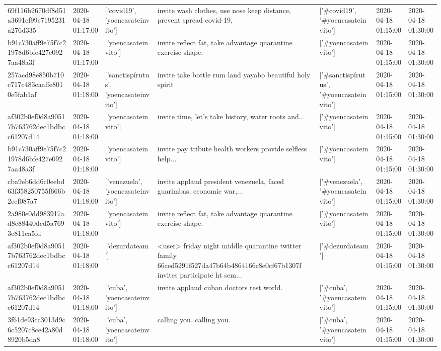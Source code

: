 \begin{tabular}{lllllll}
69f116b2670df8d51a3691ef99c7195231a276d335 & 2020-04-18 01:17:00 & ['covid19', 'yoencasateinvito'] & invite wash clothes, use nose keep distance, prevent spread covid-19, & ['#covid19', '#yoencasateinvito'] & 2020-04-18 01:15:00 & 2020-04-18 01:30:00 \\
b91c730aff9e75f7c21978d6bfe427e0927aa48a3f & 2020-04-18 01:17:00 & ['yoencasateinvito'] & invite reflect fat, take advantage quarantine exercise shape. & ['#yoencasateinvito'] & 2020-04-18 01:15:00 & 2020-04-18 01:30:00 \\
257acd98e850b710c717c483caaffe8010e5fab1af & 2020-04-18 01:18:00 & ['sanctispírutus', 'yoencasateinvito'] & invite take bottle rum land yayabo beautiful holy spirit & ['#sanctispírutus', '#yoencasateinvito'] & 2020-04-18 01:15:00 & 2020-04-18 01:30:00 \\
af302b0ef0d8a90517b763762dec1bdbcc61207d14 & 2020-04-18 01:18:00 & ['yoencasateinvito'] & invite time, let's take history, water roots and... & ['#yoencasateinvito'] & 2020-04-18 01:15:00 & 2020-04-18 01:30:00 \\
b91c730aff9e75f7c21978d6bfe427e0927aa48a3f & 2020-04-18 01:18:00 & ['yoencasateinvito'] & invite pay tribute health workers provide selfless help... & ['#yoencasateinvito'] & 2020-04-18 01:15:00 & 2020-04-18 01:30:00 \\
cba9eb6dd6c0eebd63f358250755f666b2ecf087a7 & 2020-04-18 01:18:00 & ['venezuela', 'yoencasateinvito'] & invite applaud president venezuela, faced guarimbas, economic war,... & ['#venezuela', '#yoencasateinvito'] & 2020-04-18 01:15:00 & 2020-04-18 01:30:00 \\
2a980e0dd983917ad8c88440dcd5a7693c811ca5fd & 2020-04-18 01:18:00 & ['yoencasateinvito'] & invite reflect fat, take advantage quarantine exercise shape. & ['#yoencasateinvito'] & 2020-04-18 01:15:00 & 2020-04-18 01:30:00 \\
af302b0ef0d8a90517b763762dec1bdbcc61207d14 & 2020-04-18 01:18:00 & ['dezurdateam'] & <user> friday night middle quarantine twitter family 66ced5291f527da47b64b4864166c8e0cf67b1307f invites participate ht sem... & ['#dezurdateam'] & 2020-04-18 01:15:00 & 2020-04-18 01:30:00 \\
af302b0ef0d8a90517b763762dec1bdbcc61207d14 & 2020-04-18 01:18:00 & ['cuba', 'yoencasateinvito'] & invite applaud cuban doctors rest world. & ['#cuba', '#yoencasateinvito'] & 2020-04-18 01:15:00 & 2020-04-18 01:30:00 \\
3f61de93cc3013d9c6c5207c8ce42a80d8920b5da8 & 2020-04-18 01:18:00 & ['cuba', 'yoencasateinvito'] & calling you. calling you. & ['#cuba', '#yoencasateinvito'] & 2020-04-18 01:15:00 & 2020-04-18 01:30:00 \\

\end{tabular}
